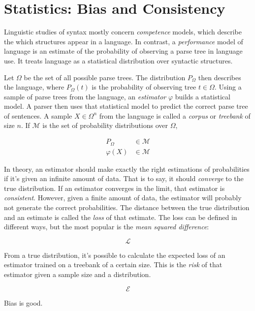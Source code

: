 \section{Statistics: Bias and Consistency}\label{sec:Statistics}



Linguistic studies of syntax mostly concern \emph{competence} models, which describe the which structures appear in a language. In contrast, a \emph{performance} model of language is an estimate of the probability of observing a parse tree in language use. It treats language as a statistical distribution over syntactic structures.

Let $\Omega$ be the set of all possible parse trees. The distribution $P_\Omega$ then describes the language, where $P_\Omega(t)$ is the probability of observing tree $t \in \Omega$. Using a sample of parse trees from the language, an \emph{estimator} $\varphi$ builds a statistical model. A parser then uses that statistical model to predict the correct parse tree of sentences.
A sample $X \in \Omega^n$ from the language is called a \emph{corpus} or \emph{treebank} of size $n$. If $\mathcal{M}$ is the set of probability distributions over $\Omega$,

\begin{align}
P_\Omega &\in \mathcal{M} \\
\varphi(X) &\in \mathcal{M}
\end{align}

In theory, an estimator should make exactly the right estimations of probabilities if it's given an infinite amount of data. That is to say, it should \emph{converge} to the true distribution. If an estimator converges in the limit, that estimator is \emph{consistent}.
However, given a finite amount of data, the estimator will probably not generate the correct probabilities. The distance between the true distribution and an estimate is called the \emph{loss} of that estimate. The loss can be defined in different ways, but the most popular is the \emph{mean squared difference}:

$$ \mathcal{L} $$

From a true distribution, it's possible to calculate the expected loss of an estimator trained on a treebank of a certain size. This is the \emph{risk} of that estimator given a sample size and a distribution.

$$ \mathcal{E} $$










Bias is good.
